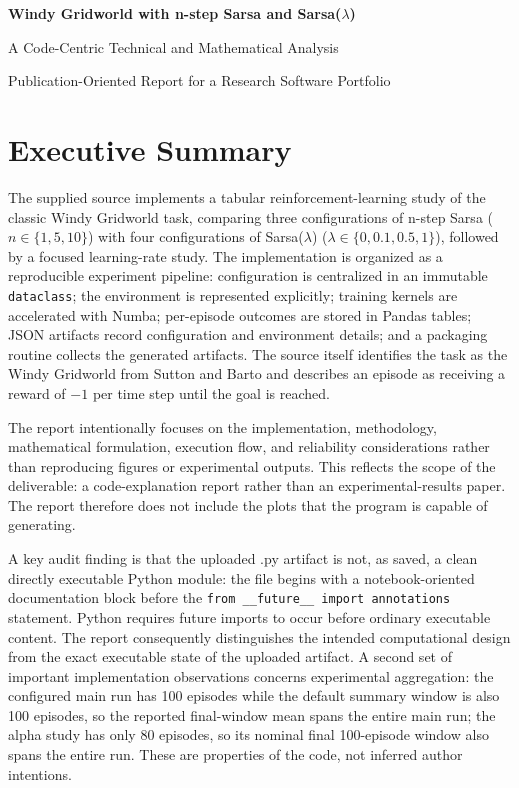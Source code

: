 \documentclass[11pt,a4paper]{article}
\begin{document}
\begin{titlepage}
\centering
\vspace*{2.0cm}
{\LARGE\bfseries Windy Gridworld with n-step Sarsa and Sarsa($\lambda$)\par}
\vspace{0.45cm}
{\Large A Code-Centric Technical and Mathematical Analysis\par}
\vfill
{\large Publication-Oriented Report for a Research Software Portfolio\par}
\vspace*{1.2cm}
\end{titlepage}

\tableofcontents
\newpage

\section*{Executive Summary}
The supplied source implements a tabular reinforcement-learning study of the classic Windy Gridworld task, comparing three configurations of n-step Sarsa ($n\in\{1,5,10\}$) with four configurations of Sarsa($\lambda$) ($\lambda\in\{0,0.1,0.5,1\}$), followed by a focused learning-rate study. The implementation is organized as a reproducible experiment pipeline: configuration is centralized in an immutable \texttt{dataclass}; the environment is represented explicitly; training kernels are accelerated with Numba; per-episode outcomes are stored in Pandas tables; JSON artifacts record configuration and environment details; and a packaging routine collects the generated artifacts. The source itself identifies the task as the Windy Gridworld from Sutton and Barto and describes an episode as receiving a reward of $-1$ per time step until the goal is reached.

The report intentionally focuses on the implementation, methodology, mathematical formulation, execution flow, and reliability considerations rather than reproducing figures or experimental outputs. This reflects the scope of the deliverable: a code-explanation report rather than an experimental-results paper. The report therefore does not include the plots that the program is capable of generating.

A key audit finding is that the uploaded .py artifact is not, as saved, a clean directly executable Python module: the file begins with a notebook-oriented documentation block before the \texttt{from \_\_future\_\_ import annotations} statement. Python requires future imports to occur before ordinary executable content. The report consequently distinguishes the intended computational design from the exact executable state of the uploaded artifact. A second set of important implementation observations concerns experimental aggregation: the configured main run has 100 episodes while the default summary window is also 100 episodes, so the reported final-window mean spans the entire main run; the alpha study has only 80 episodes, so its nominal final 100-episode window also spans the entire run. These are properties of the code, not inferred author intentions.
\end{document}
